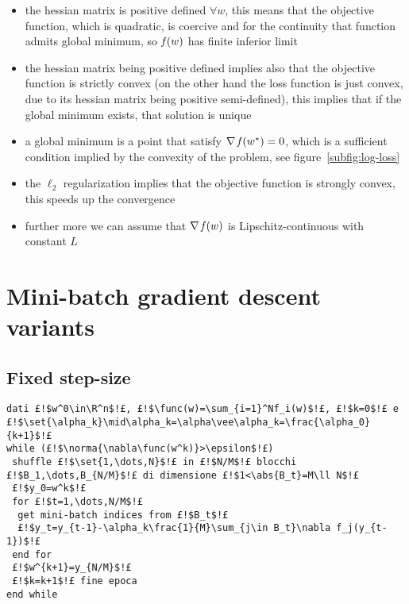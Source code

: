 \begin{itemize}
\item the hessian matrix is positive defined $\forall w$, this means that the objective function, which is quadratic, is coercive and for the continuity that function admits global minimum, so $\operatorname*{\mathit{f}}(w)$ has finite inferior limit
\item the hessian matrix being positive defined implies also that the objective function is strictly convex (on the other hand the loss function is just convex, due to its hessian matrix being positive semi-defined), this implies that if the global minimum exists, that solution is unique
\item a global minimum is a point that satisfy $\nabla\operatorname*{\mathit{f}}(w^\ast)=0$, which is a sufficient condition implied by the convexity of the problem, see figure~\vref{subfig:log-loss}
\item the $\ell_2$ regularization implies that the objective function is strongly convex, this speeds up the convergence
\item further more we can assume that $\nabla\operatorname*{\mathit{f}}(w)$ is Lipschitz-continuous with constant $L$
\end{itemize}


\cleardoublepage
\section{Mini-batch gradient descent variants}

\subsection{Fixed step-size}

\begin{lstlisting}[style=simple,title={Mini-batch Gradient Descent with fixed or decreasing step-size}]
dati £!$w^0\in\R^n$!£, £!$\func(w)=\sum_{i=1}^Nf_i(w)$!£, £!$k=0$!£ e £!$\set{\alpha_k}\mid\alpha_k=\alpha\vee\alpha_k=\frac{\alpha_0}{k+1}$!£
while (£!$\norma{\nabla\func(w^k)}>\epsilon$!£)
 shuffle £!$\set{1,\dots,N}$!£ in £!$N/M$!£ blocchi £!$B_1,\dots,B_{N/M}$!£ di dimensione £!$1<\abs{B_t}=M\ll N$!£
 £!$y_0=w^k$!£
 for £!$t=1,\dots,N/M$!£
  get mini-batch indices from £!$B_t$!£
  £!$y_t=y_{t-1}-\alpha_k\frac{1}{M}\sum_{j\in B_t}\nabla f_j(y_{t-1})$!£
 end for
 £!$w^{k+1}=y_{N/M}$!£
 £!$k=k+1$!£ fine epoca
end while
\end{lstlisting}

